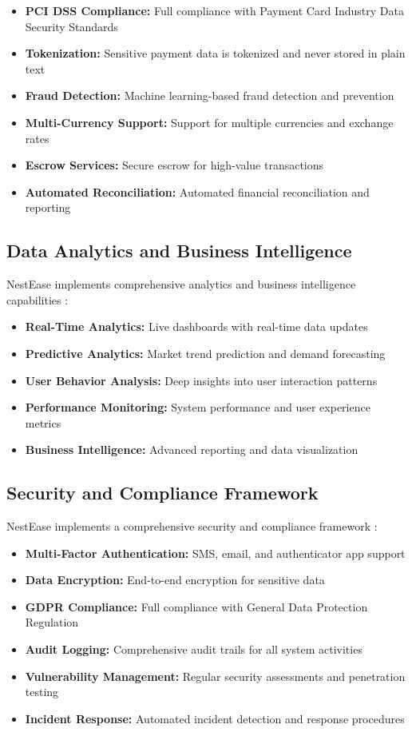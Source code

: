 \documentclass[conference]{IEEEtran}
\begin{document}
\begin{itemize}
    \item \textbf{PCI DSS Compliance:} Full compliance with Payment Card Industry Data Security Standards
    \item \textbf{Tokenization:} Sensitive payment data is tokenized and never stored in plain text
    \item \textbf{Fraud Detection:} Machine learning-based fraud detection and prevention
    \item \textbf{Multi-Currency Support:} Support for multiple currencies and exchange rates
    \item \textbf{Escrow Services:} Secure escrow for high-value transactions
    \item \textbf{Automated Reconciliation:} Automated financial reconciliation and reporting
\end{itemize}

\subsection{Data Analytics and Business Intelligence}
NestEase implements comprehensive analytics and business intelligence capabilities \cite{data_analytics}:

\begin{itemize}
    \item \textbf{Real-Time Analytics:} Live dashboards with real-time data updates
    \item \textbf{Predictive Analytics:} Market trend prediction and demand forecasting
    \item \textbf{User Behavior Analysis:} Deep insights into user interaction patterns
    \item \textbf{Performance Monitoring:} System performance and user experience metrics
    \item \textbf{Business Intelligence:} Advanced reporting and data visualization
\end{itemize}

\subsection{Security and Compliance Framework}
NestEase implements a comprehensive security and compliance framework \cite{security_framework}:

\begin{itemize}
    \item \textbf{Multi-Factor Authentication:} SMS, email, and authenticator app support
    \item \textbf{Data Encryption:} End-to-end encryption for sensitive data
    \item \textbf{GDPR Compliance:} Full compliance with General Data Protection Regulation
    \item \textbf{Audit Logging:} Comprehensive audit trails for all system activities
    \item \textbf{Vulnerability Management:} Regular security assessments and penetration testing
    \item \textbf{Incident Response:} Automated incident detection and response procedures
\end{itemize}
\end{document}
